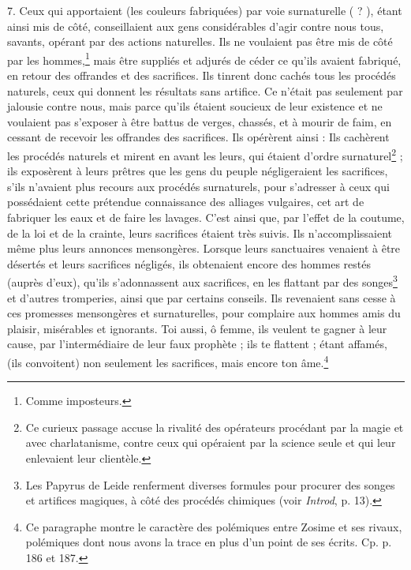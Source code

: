 \documentclass[landscape, a4paper, 11pt, oneside, polutonikogreek, french]{article}
\begin{document}
7. Ceux qui apportaient (les couleurs fabriquées) par voie surnaturelle ( ? ), étant ainsi mis de côté, conseillaient aux gens considérables d'agir contre nous tous, savants, opérant par des actions naturelles. Ils ne voulaient pas être mis de côté par les hommes,\footnote{Comme imposteurs.} mais être suppliés et adjurés de céder ce qu'ils avaient fabriqué, en retour des offrandes et des sacrifices. Ils tinrent donc cachés tous les procédés naturels, ceux qui donnent les résultats sans artifice. Ce n'était pas seulement par jalousie contre nous, mais parce qu'ils étaient soucieux de leur existence et ne voulaient pas s'exposer à être battus de verges, chassés, et à mourir de faim, en cessant de recevoir les offrandes des sacrifices. Ils opérèrent ainsi : Ils cachèrent les procédés naturels et mirent en avant les leurs, qui étaient d'ordre surnaturel\footnote{Ce curieux passage accuse la rivalité des opérateurs procédant par la magie et avec charlatanisme, contre ceux qui opéraient par la science seule et qui leur enlevaient leur clientèle.} ; ils exposèrent à leurs prêtres que les gens du peuple négligeraient les sacrifices, s'ils n'avaient plus recours aux procédés surnaturels, pour s'adresser à ceux qui possédaient cette prétendue connaissance des alliages vulgaires, cet art de fabriquer les eaux et de faire les lavages. C'est ainsi que, par l'effet de la coutume, de la loi et de la crainte, leurs sacrifices étaient très suivis. Ils n'accomplissaient même plus leurs annonces mensongères. Lorsque leurs sanctuaires venaient à être désertés et leurs sacrifices négligés, ils obtenaient encore des hommes restés (auprès d'eux), qu'ils s'adonnassent aux sacrifices, en les flattant par des songes\footnote{Les Papyrus de Leide renferment diverses formules pour procurer des songes et artifices magiques, à côté des procédés chimiques (voir \emph{Introd}, p. 13).} et d'autres tromperies, ainsi que par certains conseils. Ils revenaient sans cesse à ces promesses mensongères et surnaturelles, pour complaire aux hommes amis du plaisir, misérables et ignorants. Toi aussi, ô femme, ils veulent te gagner à leur cause, par l'intermédiaire de leur faux prophète ; ils te flattent ; étant affamés, (ils convoitent) non seulement les sacrifices, mais encore ton âme.\footnote{Ce paragraphe montre le caractère des polémiques entre Zosime et ses rivaux, polémiques dont nous avons la trace en plus d'un point de ses écrits. Cp. p. 186 et 187.}
\end{document}
